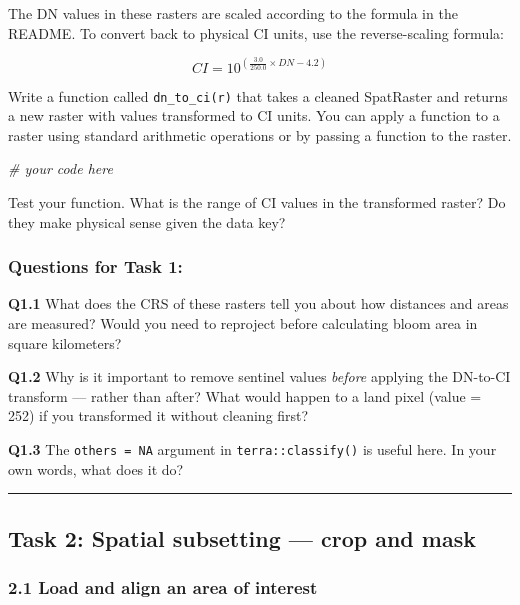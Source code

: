 \documentclass[
]{article}
\newenvironment{Shaded}{\begin{snugshade}}{\end{snugshade}}
\newcommand{\CommentTok}[1]{\textcolor[rgb]{0.56,0.35,0.01}{\textit{#1}}}
\begin{document}
The DN values in these rasters are scaled according to the formula in
the README. To convert back to physical CI units, use the
reverse-scaling formula:

\[CI = 10^{\left(\frac{3.0}{250.0} \times DN - 4.2\right)}\]

Write a function called \texttt{dn\_to\_ci(r)} that takes a cleaned
SpatRaster and returns a new raster with values transformed to CI units.
You can apply a function to a raster using standard arithmetic
operations or by passing a function to the raster.

\begin{Shaded}
\begin{Highlighting}[]
\CommentTok{\# your code here}
\end{Highlighting}
\end{Shaded}

Test your function. What is the range of CI values in the transformed
raster? Do they make physical sense given the data key?

\subsubsection{Questions for Task 1:}\label{questions-for-task-1}

\textbf{Q1.1} What does the CRS of these rasters tell you about how
distances and areas are measured? Would you need to reproject before
calculating bloom area in square kilometers?

\textbf{Q1.2} Why is it important to remove sentinel values
\emph{before} applying the DN-to-CI transform --- rather than after?
What would happen to a land pixel (value = 252) if you transformed it
without cleaning first?

\textbf{Q1.3} The \texttt{others\ =\ NA} argument in
\texttt{terra::classify()} is useful here. In your own words, what does
it do?

\begin{center}\rule{0.5\linewidth}{0.5pt}\end{center}

\subsection{Task 2: Spatial subsetting --- crop and
mask}\label{task-2-spatial-subsetting-crop-and-mask}

\subsubsection{2.1 Load and align an area of
interest}\label{load-and-align-an-area-of-interest}
\end{document}

